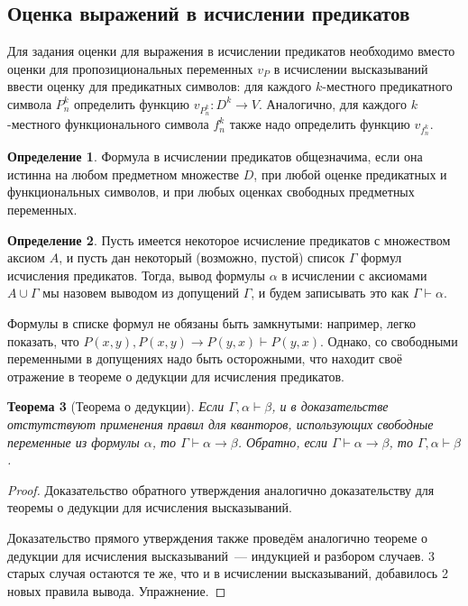 \documentclass[a4paper,11pt]{article}
\newtheorem{thm}{Теорема}[section]
\theoremstyle{definition}
\newtheorem{dfn}[thm]{Определение}
\newcommand{\proves}{\vdash}
\begin{document}
\subsection{Оценка выражений в исчислении предикатов}
Для задания оценки для выражения в исчислении предикатов необходимо вместо
оценки для пропозициональных переменных $v_P$ в исчислении высказываний ввести
оценку для предикатных символов: для каждого $k$-местного предикатного символа
$P^k_n$ определить функцию $v_{P^k_n} : D^k \to V$. Аналогично, для каждого
$k$-местного функционального символа $f^k_n$ также надо определить функцию
$v_{f^k_n}$.

\begin{dfn}
Формула в исчислении предикатов общезначима, если она истинна на любом
предметном множестве $D$, при любой оценке предикатных и функциональных
символов, и при любых оценках свободных предметных переменных.
\end{dfn}

\begin{dfn}
Пусть имеется некоторое исчисление предикатов с множеством аксиом $A$, и пусть
дан некоторый (возможно, пустой) список $\Gamma$ формул исчисления предикатов.
Тогда, вывод формулы $\alpha$ в исчислении с аксиомами $A \cup \Gamma$ мы
назовем выводом из допущений $\Gamma$, и будем записывать это как $\Gamma
\proves \alpha$.
\end{dfn}

Формулы в списке формул не обязаны быть замкнутыми: например, легко показать,
что $P(x, y), P(x, y) \to P(y, x) \proves P(y, x)$. Однако, со свободными
переменными в допущениях надо быть осторожными, что находит своё отражение в
теореме о дедукции для исчисления предикатов.

\begin{thm}[Теорема о дедукции]
Если $\Gamma, \alpha \proves \beta$, и в доказательстве отстутствуют применения
правил для кванторов, использующих свободные переменные из формулы $\alpha$, то
$\Gamma \proves \alpha \to \beta$. Обратно, если $\Gamma \proves \alpha \to
\beta$, то $\Gamma, \alpha \proves \beta$.
\end{thm}
\begin{proof}
Доказательство обратного утверждения аналогично доказательству для теоремы о
дедукции для исчисления высказываний.

Доказательство прямого утверждения также проведём аналогично теореме о дедукции
для исчисления высказываний~--- индукцией и разбором случаев. 3 старых случая
остаются те же, что и в исчислении высказываний, добавилось 2 новых правила
вывода. Упражнение.
\end{proof}
\end{document}
